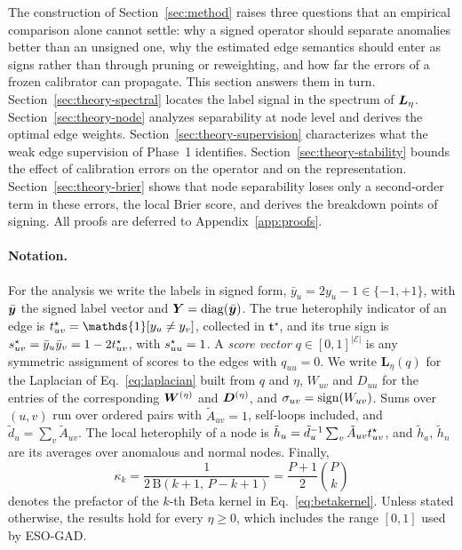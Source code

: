 The construction of Section~\ref{sec:method} raises three questions that an empirical comparison alone cannot settle: why a signed operator should separate anomalies better than an unsigned one, why the estimated edge semantics should enter as signs rather than through pruning or reweighting, and how far the errors of a frozen calibrator can propagate.
This section answers them in turn.
Section~\ref{sec:theory-spectral} locates the label signal in the spectrum of $\bm{L}_{\eta}$.
Section~\ref{sec:theory-node} analyzes separability at node level and derives the optimal edge weights.
Section~\ref{sec:theory-supervision} characterizes what the weak edge supervision of Phase~1 identifies.
Section~\ref{sec:theory-stability} bounds the effect of calibration errors on the operator and on the representation.
Section~\ref{sec:theory-brier} shows that node separability loses only a second-order term in these errors, the local Brier score, and derives the breakdown points of signing.
All proofs are deferred to Appendix~\ref{app:proofs}.

\paragraph{Notation.}
For the analysis we write the labels in signed form, $\bar y_u=2y_u-1\in\{-1,+1\}$, with $\bar{\bm{y}}$ the signed label vector and $\bm{Y}=\operatorname{diag}(\bar{\bm{y}})$.
The true heterophily indicator of an edge is $\tstar_{uv}=\mathds{1}[y_u\neq y_v]$, collected in $\bm t^\star$, and its true sign is $s^{\star}_{uv}=\bar y_u\bar y_v=1-2t^{\star}_{uv}$, with $s^{\star}_{uu}=1$.
A \emph{score vector} $q\in[0,1]^{|\mathcal E|}$ is any symmetric assignment of scores to the edges with $q_{uu}=0$.
We write $\bm L_\eta(q)$ for the Laplacian of Eq.~\eqref{eq:laplacian} built from $q$ and $\eta$, $W_{uv}$ and $D_{uu}$ for the entries of the corresponding $\bm{W}^{(\eta)}$ and $\bm{D}^{(\eta)}$, and $\sigma_{uv}=\operatorname{sign}(W_{uv})$.
Sums over $(u,v)$ run over ordered pairs with $\tilde A_{uv}=1$, self-loops included, and $\tilde d_u=\sum_v\tilde A_{uv}$.
The local heterophily of a node is $\tilde h_u=\tilde d_u^{-1}\sum_v\tilde A_{uv}t^{\star}_{uv}$, and $\tilde h_a$, $\tilde h_n$ are its averages over anomalous and normal nodes.
Finally,
\begin{equation}
\kappa_k=\frac{1}{2\,\mathrm B(k{+}1,\,P{-}k{+}1)}=\frac{P{+}1}{2}\binom{P}{k}
\label{eq:kappa}
\end{equation}
denotes the prefactor of the $k$-th Beta kernel in Eq.~\eqref{eq:betakernel}.
Unless stated otherwise, the results hold for every $\eta\ge0$, which includes the range $[0,1]$ used by ESO-GAD.

